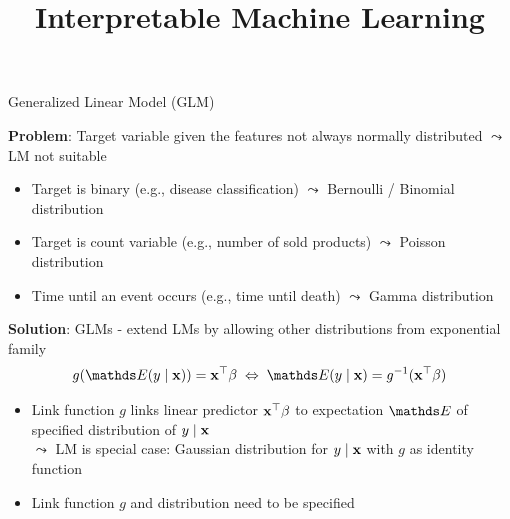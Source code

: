 \documentclass[11pt,compress,t,notes=noshow, aspectratio=169, xcolor=table]{beamer}
\title{Interpretable Machine Learning}
\date{}
\begin{document}
\newcommand{\titlefigure}{figure/whitebox}
\newcommand{\learninggoals}{
\item Definition of GLMs
\item Logistic regression as example
\item Interpretation in logistic regression
}



\begin{frame}{Generalized Linear Model (GLM) }

\textbf{Problem}: Target variable given the features not always normally distributed $\leadsto$ LM not suitable
\begin{itemize}
    \item Target is binary (e.g., disease classification)
    $\leadsto$ Bernoulli / Binomial distribution
    \item Target is count variable (e.g., number of sold products)
    $\leadsto$ Poisson distribution
    \item Time until an event occurs (e.g., time until death)
    $\leadsto$ Gamma distribution
\end{itemize}
\medskip
\pause
\textbf{Solution}: GLMs - extend LMs by allowing other distributions from exponential family
$$g(\E (y \mid \xv)) = \xv^\top \beta \; \Leftrightarrow \; \E (y \mid \xv) = g^{-1}(\xv^\top \beta)$$
\vspace*{-0.5cm}
    \begin{itemize}[<+->]
        \item Link function $g$ links linear predictor $\xv^\top \beta$ to expectation $\E$ of specified distribution of $y \mid \xv$\\
        $\leadsto$ LM is special case: Gaussian distribution for $y \mid \xv$ with $g$ as identity function 
        \item Link function $g$ and distribution need to be specified 

\end{itemize}
\end{frame}
\end{document}
